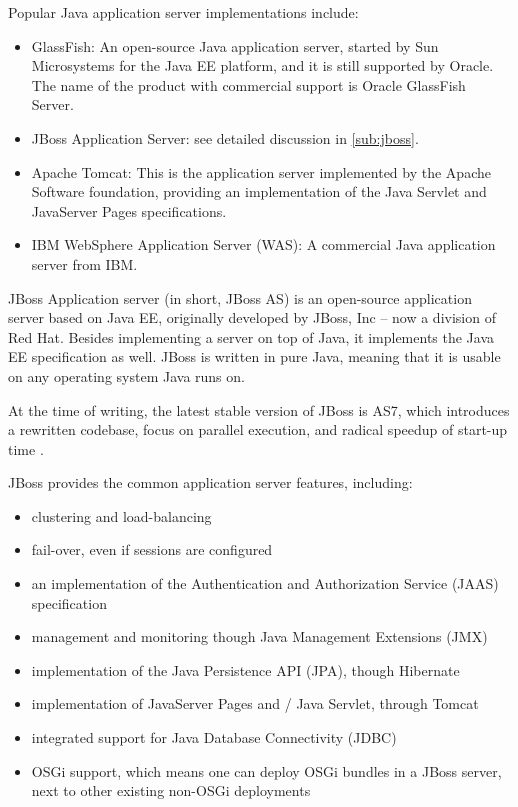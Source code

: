 Popular Java application server implementations include:

\begin{itemize}
\item GlassFish: An open-source Java application server, started by Sun
Microsystems for the Java EE platform, and it is still supported by Oracle. The
name of the product with commercial support is Oracle GlassFish Server.
\item JBoss Application Server: see detailed discussion in \autoref{sub:jboss}.
\item Apache Tomcat: This is the application server implemented by the Apache
Software foundation, providing an implementation of the Java Servlet and
JavaServer Pages specifications.
\item IBM WebSphere Application Server (WAS): A commercial Java application
server from IBM.
\end{itemize}

\label{sub:jboss}

JBoss Application server (in short, JBoss AS) is an open-source application server
based on Java EE, originally developed by JBoss, Inc -- now a division of Red
Hat. Besides implementing a server on top of Java, it implements the Java
EE specification as well.  JBoss is written in pure Java, meaning that it is
usable on any operating system Java runs on.

At the time of writing, the latest stable version of JBoss is AS7, which
introduces a rewritten codebase, focus on parallel execution, and radical speedup
of start-up time \cite{jboss-fast}.

JBoss provides the common application server features, including:

\begin{itemize}
\item clustering and load-balancing
\item fail-over, even if sessions are configured
\item an implementation of the Authentication and Authorization Service (JAAS)
specification
\item management and monitoring though Java Management Extensions (JMX)
\item implementation of the Java Persistence API (JPA), though Hibernate
\item implementation of JavaServer Pages and / Java Servlet, through Tomcat
\item integrated support for Java Database Connectivity (JDBC)
\item OSGi support, which means one can deploy OSGi bundles in a JBoss server,
next to other existing non-OSGi deployments
\end{itemize}

